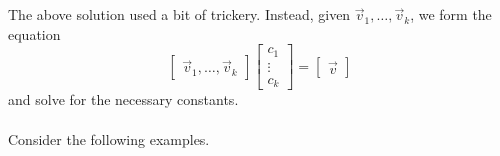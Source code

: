         \vphantom
        \\
        \\
        The above solution used a bit of trickery. Instead, given \(\vec{v}_1,\ldots,\vec{v}_k\), we form the equation
        \begin{equation*}
            \begin{bmatrix}
                \vec{v}_1,\ldots,\vec{v}_k
            \end{bmatrix}
            \begin{bmatrix}
                c_1 \\ \vdots \\ c_k
            \end{bmatrix}
            =\begin{bmatrix} \vec{v} \end{bmatrix}
        \end{equation*}
        and solve for the necessary constants.
        \pagebreak
        \\
        \\
        Consider the following examples.
